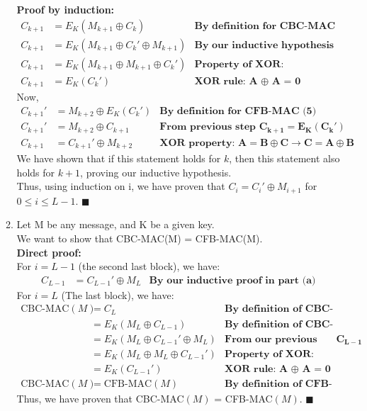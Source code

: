 \documentclass[11pt]{article}
\theoremstyle{definition}
\begin{document}
\begin{enumerate}
\begin{enumerate}
\textbf{Proof by induction: }
\begin{align*}
C_{k+1} &= E_K(M_{k+1} \oplus C_k) &\textbf{By definition for CBC-MAC (2)}\\
C_{k+1} &= E_K(M_{k+1} \oplus C_k' \oplus M_{k+1}) &\textbf{By our inductive hypothesis}\\
C_{k+1} &= E_K(M_{k+1} \oplus M_{k+1} \oplus C_k') &\textbf{Property of XOR: Commutative}\\
C_{k+1} &= E_K(C_k') &\textbf{XOR rule: A } \mathbf{\oplus} \textbf{ A = 0}
\end{align*}
Now,
\begin{align*}
C_{k+1}' &= M_{k+2} \oplus E_K(C_{k}') &\textbf{By definition for CFB-MAC (5)}\\
C_{k+1}' &= M_{k+2} \oplus C_{k+1} &\textbf{From previous step } \mathbf{C_{k+1} = E_K(C_k')}\\
C_{k+1} &= C_{k+1}' \oplus M_{k+2} &\textbf{XOR property: }\mathbf{A = B \oplus C \rightarrow C = A \oplus B}
\end{align*}
We have shown that if this statement holds for $k$, then this statement also holds for $k+1$, proving our inductive hypothesis.\\

Thus, using induction on i, we have proven that $C_i = C_i' \oplus M_{i+1}$ for $0 \le i \le L -1$. $\blacksquare$\\

\item Let M be any message, and K be a given key. \\
We want to show that CBC-MAC(M) = CFB-MAC(M).\\

\textbf{Direct proof: }\\
For $i = L - 1$ (the second last block), we have:
\begin{align*}
C_{L-1} &= C_{L-1}' \oplus M_{L} &\textbf{By our inductive proof in part (a)}
\end{align*}
For $i = L$ (The last block), we have:
\begin{align*}
\text{CBC-MAC} (M) &= C_L &\textbf{By definition of CBC-MAC (3)}\\
&= E_K(M_L \oplus C_{L-1}) &\textbf{By definition of CBC-MAC (2)}\\
&= E_K(M_L \oplus C_{L-1}' \oplus M_L) &\textbf{From our previous step on } \mathbf{C_{L-1}}\\
&= E_K(M_L \oplus M_L \oplus  C_{L-1}') &\textbf{Property of XOR: Commutative}\\
&= E_K(C_{L-1}') &\textbf{XOR rule: A } \mathbf{\oplus} \textbf{ A = 0}\\
\text{CBC-MAC}(M) &= \text{CFB-MAC}(M) &\textbf{By definition of CFB-MAC (6)}
\end{align*}
Thus, we have proven that CBC-MAC$(M)$ = CFB-MAC$(M)$. $\blacksquare$


\end{enumerate}
\end{enumerate}
\end{document}
